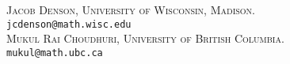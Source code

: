 \documentclass[12pt]{amsart}
\begin{document}
\vspace{1em}
\noindent \textsc{Jacob Denson, University of Wisconsin, Madison}. \\
 \texttt{jcdenson@math.wisc.edu}\\
 
 
\noindent \textsc{Mukul Rai Choudhuri, University of British Columbia}. \\
 \texttt{mukul@math.ubc.ca}


\end{document}
